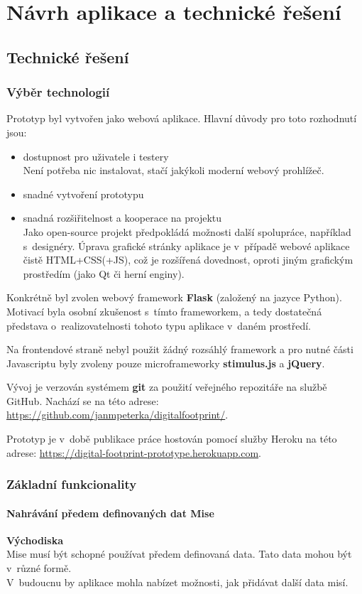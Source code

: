 \chapter{Návrh aplikace a technické řešení}

\section{Technické řešení}
\subsection{Výběr technologií}
Prototyp byl vytvořen jako webová aplikace.
Hlavní důvody pro toto rozhodnutí jsou:
\begin{itemize}
	\item dostupnost pro uživatele i testery\\
	Není potřeba nic instalovat, stačí jakýkoli moderní webový prohlížeč.
	\item snadné vytvoření prototypu
	\item snadná rozšiřitelnost a kooperace na projektu\\ Jako open-source projekt předpokládá možnosti další spolupráce, například s~designéry. Úprava grafické stránky aplikace je v~případě webové aplikace čistě HTML+CSS(+JS), což je rozšířená dovednost, oproti jiným grafickým prostředím (jako Qt či herní enginy).
\end{itemize}

Konkrétně byl zvolen webový framework \textbf{Flask} (založený na jazyce Python). Motivací byla osobní zkušenost s~tímto frameworkem, a tedy dostatečná představa o~realizovatelnosti tohoto typu aplikace v~daném prostředí.

Na frontendové straně nebyl použit žádný rozsáhlý framework a pro nutné části Javascriptu byly zvoleny pouze microframeworky \textbf{stimulus.js} a \textbf{jQuery}.

Vývoj je verzován systémem \textbf{git} za použití veřejného repozitáře na službě GitHub. Nachází se na této adrese: \url{https://github.com/janmpeterka/digitalfootprint/}.

Prototyp je v~době publikace práce hostován pomocí služby Heroku na této adrese: \url{https://digital-footprint-prototype.herokuapp.com}.

\subsection{Základní funkcionality}
\subsubsection*{Nahrávání předem definovaných dat Mise}
	\textbf{Východiska}\\
	Mise musí být schopné používat předem definovaná data. Tato data mohou být v~různé formě.\\
	V~budoucnu by aplikace mohla nabízet možnosti, jak přidávat další data misí.
	
